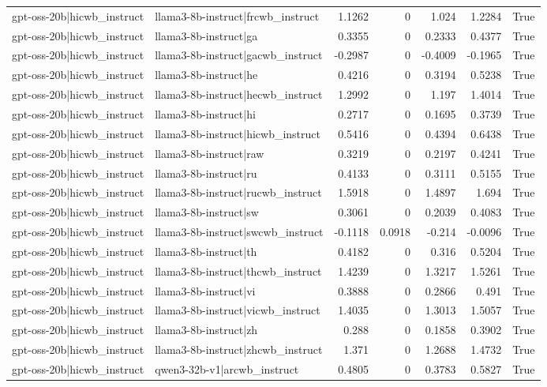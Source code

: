 \begin{table}
\begin{tabular}{l l r r r r l}
gpt-oss-20b|hicwb_instruct & llama3-8b-instruct|frcwb_instruct & 1.1262 & 0 & 1.024 & 1.2284 & True \\
gpt-oss-20b|hicwb_instruct & llama3-8b-instruct|ga & 0.3355 & 0 & 0.2333 & 0.4377 & True \\
gpt-oss-20b|hicwb_instruct & llama3-8b-instruct|gacwb_instruct & -0.2987 & 0 & -0.4009 & -0.1965 & True \\
gpt-oss-20b|hicwb_instruct & llama3-8b-instruct|he & 0.4216 & 0 & 0.3194 & 0.5238 & True \\
gpt-oss-20b|hicwb_instruct & llama3-8b-instruct|hecwb_instruct & 1.2992 & 0 & 1.197 & 1.4014 & True \\
gpt-oss-20b|hicwb_instruct & llama3-8b-instruct|hi & 0.2717 & 0 & 0.1695 & 0.3739 & True \\
gpt-oss-20b|hicwb_instruct & llama3-8b-instruct|hicwb_instruct & 0.5416 & 0 & 0.4394 & 0.6438 & True \\
gpt-oss-20b|hicwb_instruct & llama3-8b-instruct|raw & 0.3219 & 0 & 0.2197 & 0.4241 & True \\
gpt-oss-20b|hicwb_instruct & llama3-8b-instruct|ru & 0.4133 & 0 & 0.3111 & 0.5155 & True \\
gpt-oss-20b|hicwb_instruct & llama3-8b-instruct|rucwb_instruct & 1.5918 & 0 & 1.4897 & 1.694 & True \\
gpt-oss-20b|hicwb_instruct & llama3-8b-instruct|sw & 0.3061 & 0 & 0.2039 & 0.4083 & True \\
gpt-oss-20b|hicwb_instruct & llama3-8b-instruct|swcwb_instruct & -0.1118 & 0.0918 & -0.214 & -0.0096 & True \\
gpt-oss-20b|hicwb_instruct & llama3-8b-instruct|th & 0.4182 & 0 & 0.316 & 0.5204 & True \\
gpt-oss-20b|hicwb_instruct & llama3-8b-instruct|thcwb_instruct & 1.4239 & 0 & 1.3217 & 1.5261 & True \\
gpt-oss-20b|hicwb_instruct & llama3-8b-instruct|vi & 0.3888 & 0 & 0.2866 & 0.491 & True \\
gpt-oss-20b|hicwb_instruct & llama3-8b-instruct|vicwb_instruct & 1.4035 & 0 & 1.3013 & 1.5057 & True \\
gpt-oss-20b|hicwb_instruct & llama3-8b-instruct|zh & 0.288 & 0 & 0.1858 & 0.3902 & True \\
gpt-oss-20b|hicwb_instruct & llama3-8b-instruct|zhcwb_instruct & 1.371 & 0 & 1.2688 & 1.4732 & True \\
gpt-oss-20b|hicwb_instruct & qwen3-32b-v1|arcwb_instruct & 0.4805 & 0 & 0.3783 & 0.5827 & True \\

\end{tabular}
\end{table}

